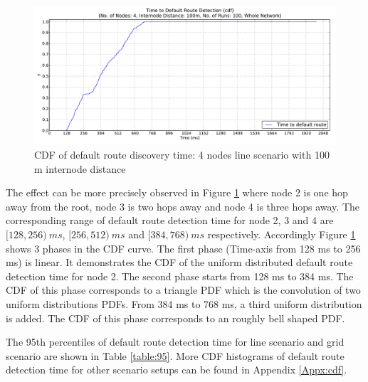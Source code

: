 \begin{figure}[htbp]
  \begin{center}
    \leavevmode
      \includegraphics[scale=0.38]
      {Pics/results/4/MRHOF/line/dist100_montecarlo_cdf_hist.pdf}
   \caption{CDF of default route discovery time: 4 nodes line scenario with 100 m internode distance}
    \label{fig:dist100_montecarlo_cdf_hist}
  \end{center}
   \vspace{-20pt}
\end{figure}

The effect can be more precisely observed in Figure \ref{fig:dist100_montecarlo_cdf_hist} where node 2 is one hop away from the root, node 3 is two hops away and node 4 is three hops away. The corresponding range of default route detection time for node 2, 3 and 4 are $[128, 256)\:ms$, $[256, 512)\:ms$ and $[384, 768)\:ms$ respectively. Accordingly Figure \ref{fig:dist100_montecarlo_cdf_hist} shows 3 phases in the CDF curve. The first phase (Time-axis from 128 ms to 256 ms) is linear. It demonstrates the CDF of the uniform distributed default route detection time for node 2. The second phase starts from 128 ms to 384 ms. The CDF of this phase corresponds to a triangle PDF which is the convolution of two uniform distributions PDFs. From 384 ms to 768 ms, a third uniform distribution is added. The CDF of this phase corresponds to an roughly bell shaped PDF.

The 95th percentiles of default route detection time for line scenario and grid scenario are shown in Table \ref{table:95}. More CDF histograms of default route detection time for other scenario setups can be found in Appendix \ref{Appx:cdf}. 

